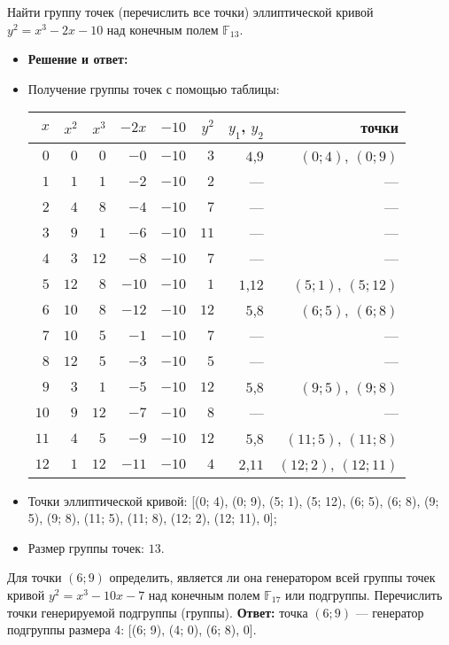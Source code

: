 \tasknumber Найти группу точек (перечислить все точки) эллиптической кривой $y^2 = x^3 - 2 x - 10$ над конечным полем $\mathbb{F}_{13}$.
\begin{itemize}
\item \textbf{Решение и ответ:}
\item Получение группы точек с помощью таблицы:\\
\begin{tabular}{|r|r|r|r|r|r|r|r|}
\hline
$x$ & $x^2$ & $x^3$ & $-2x$ & $-10$ & $y^2$ & $y_1$, $y_2$ & точки \\ 
\hline
$0$ & $0$ & $0$ & $-0$ & $-10$ & $3$ & $4$,$9$ &$(0; 4)$, $(0; 9)$ \\ 
$1$ & $1$ & $1$ & $-2$ & $-10$ & $2$ &  --- & --- \\ 
$2$ & $4$ & $8$ & $-4$ & $-10$ & $7$ &  --- & --- \\ 
$3$ & $9$ & $1$ & $-6$ & $-10$ & $11$ &  --- & --- \\ 
$4$ & $3$ & $12$ & $-8$ & $-10$ & $7$ &  --- & --- \\ 
$5$ & $12$ & $8$ & $-10$ & $-10$ & $1$ & $1$,$12$ &$(5; 1)$, $(5; 12)$ \\ 
$6$ & $10$ & $8$ & $-12$ & $-10$ & $12$ & $5$,$8$ &$(6; 5)$, $(6; 8)$ \\ 
$7$ & $10$ & $5$ & $-1$ & $-10$ & $7$ &  --- & --- \\ 
$8$ & $12$ & $5$ & $-3$ & $-10$ & $5$ &  --- & --- \\ 
$9$ & $3$ & $1$ & $-5$ & $-10$ & $12$ & $5$,$8$ &$(9; 5)$, $(9; 8)$ \\ 
$10$ & $9$ & $12$ & $-7$ & $-10$ & $8$ &  --- & --- \\ 
$11$ & $4$ & $5$ & $-9$ & $-10$ & $12$ & $5$,$8$ &$(11; 5)$, $(11; 8)$ \\ 
$12$ & $1$ & $12$ & $-11$ & $-10$ & $4$ & $2$,$11$ &$(12; 2)$, $(12; 11)$ \\ 
\hline
\end{tabular}
\item Точки эллиптической кривой: [(0; 4), (0; 9), (5; 1), (5; 12), (6; 5), (6; 8), (9; 5), (9; 8), (11; 5), (11; 8), (12; 2), (12; 11), 0];
\item Размер группы точек: $13$.
\end{itemize}
\bigbreak

\tasknumber Для точки $\left(6; 9\right)$ определить, является ли она генератором всей группы точек кривой $y^2 = x^3 - 10 x - 7$ над конечным полем $\mathbb{F}_{17}$ или подгруппы. Перечислить точки генерируемой подгруппы (группы).
\medbreak
\textbf{Ответ:} точка $\left(6; 9\right)$ — генератор подгруппы размера 4: [(6; 9), (4; 0), (6; 8), 0].
\bigbreak

